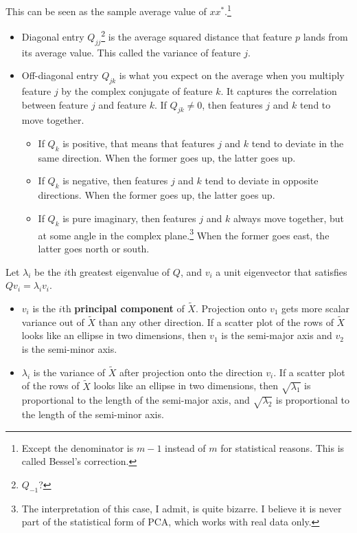 This can be seen as the sample average value of \(xx^*\).\footnote{Except the denominator is \(m-1\) instead of \(m\) for statistical reasons. This is called Bessel's correction.}
\begin{itemize}
  \item
  Diagonal entry \(Q_{jj}\)\footnote{\(Q_{-1}\)?} is the average squared distance that feature \(p\) lands from its average value. This called the variance of feature \(j\).
  \item
  Off-diagonal entry \(Q_{jk}\)
  is what you expect on the average when you multiply feature \(j\) by the complex conjugate of feature \(k\).
  It
  captures the correlation between feature \(j\) and feature \(k\).
  If \(Q_{jk} \neq 0\), then features \(j\) and \(k\) tend to move together.
  \begin{itemize}
    \item
    If \(Q_k\) is positive, that means that features \(j\) and \(k\) tend to deviate in the same direction.
    When the former goes up, the latter goes up.
    \item
    If \(Q_k\) is negative, then features \(j\) and \(k\) tend to deviate in opposite directions.
    When the former goes up, the latter goes up.
    \item
    If \(Q_k\) is pure imaginary, then features \(j\) and \(k\) always move together, but at some angle in the complex plane.\footnote{The interpretation of this case, I admit, is quite bizarre. I believe it is never part of the statistical form of PCA, which works with real data only.}
    When the former goes east, the latter goes north or south.
  \end{itemize}
\end{itemize}

Let \(\lambda_i\) be the \(i\)th greatest eigenvalue of \(Q\), and \(v_i\) a unit eigenvector that satisfies \(Qv_i = \lambda_i v_i\).
\begin{itemize}
  \item \(v_i\) is the \(i\)th \textbf{principal component} of \(\widetilde X\).
  Projection onto \(v_1\) gets more scalar variance out of \(\widetilde X\) than any other direction.
  If a scatter plot of the rows of \(\widetilde X\) looks like an ellipse in two dimensions, then \(v_1\) is the semi-major axis and \(v_2\) is the semi-minor axis.
  \item \(\lambda_i\) is the variance of \(\widetilde X\) after projection onto the direction \(v_i\).
  If a scatter plot of the rows of \(\widetilde X\) looks like an ellipse in two dimensions,
  then \(\sqrt{\lambda_1}\) is proportional to the length of the semi-major axis, and \(\sqrt{\lambda_2}\) is proportional to the length of the semi-minor axis.
\end{itemize}

